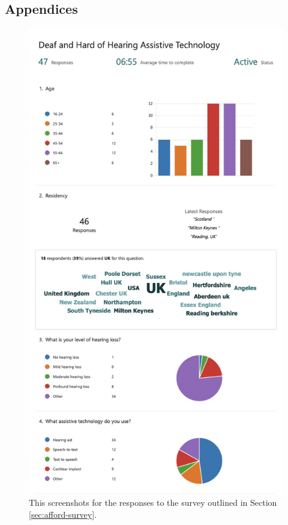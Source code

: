 \documentclass{l4proj}
\begin{document}
%
% 

\begin{appendices}
\pagestyle{plain}
\chapter{Appendices}
\label{sec:apendix}

\begin{figure}[h]
    \centering
    \includegraphics[width=0.60\linewidth]{dissertation/images/afford-survey-1.jpeg}    
    \caption{This screenshots for the responses to the survey outlined in Section \ref{sec:afford-survey}.}
    \label{fig:afford-survey-1} 
\end{figure}


\end{appendices}
\end{document}
